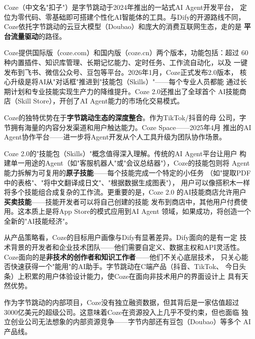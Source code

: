 Coze（中文名"扣子"）是字节跳动于2024年推出的一站式AI Agent开发平台，
定位为零代码、零基础即可搭建个性化AI智能体的工具。与Dify的开源路线不同，
Coze依托字节跳动的云豆大模型（Doubao）和庞大的消费互联网生态，走的是
\textbf{平台流量驱动}的路径。

Coze提供国际版（coze.com）和国内版（coze.cn）两个版本，功能包括：超过
60种内置插件、知识库管理、长期记忆能力、定时任务、工作流自动化，以及
一键发布到飞书、微信公众号、豆包等平台。2026年1月，Coze正式发布2.0版本，
核心升级是将AI从"对话框"推进到"技能包（Skills）"——每个专业人员都能
通过长期计划和专业技能实现生产力的降维提升。Coze 2.0还推出了全球首个
AI技能商店（Skill Store），开创了AI Agent能力的市场化交易模式。

Coze的独特优势在于\textbf{字节跳动生态的深度整合}。作为TikTok/抖音的母
公司，字节拥有海量的内容分发渠道和用户触达能力。Coze Space——2025年4月
推出的AI Agent协作平台——进一步将Agent开发从个人工具升级为团队协作场景。

Coze 2.0的"技能包（Skills）"概念值得深入理解。传统的AI Agent平台让用户
构建单一用途的Agent（如"客服机器人"或"会议总结器"），Coze的技能包则将
Agent能力拆解为可复用的\textbf{原子技能}——每个技能完成一个特定的小任务
（如"提取PDF中的表格"、"将中文翻译成日文"、"根据数据生成图表"），
用户可以像搭积木一样将多个技能组合成复杂的工作流。更重要的是，Coze 2.0
的AI技能商店允许用户\textbf{买卖技能}——技能开发者可以将自己创建的技能
发布到商店中，其他用户付费使用。这本质上是将App Store的模式应用到AI Agent
领域，如果成功，将创造一个全新的"AI技能经济"。

从产品策略看，Coze的目标用户画像与Dify有显著差异。Dify面向的是有一定
技术背景的开发者和企业技术团队——他们需要自定义、数据主权和API灵活性。
Coze面向的是\textbf{非技术的创作者和知识工作者}——他们不关心底层技术，
只关心能否快速获得一个"能用"的AI助手。字节跳动在C端产品（抖音、TikTok、
今日头条）上积累的用户体验设计能力，使Coze在面向非技术用户的界面设计上
具有天然优势。

作为字节跳动的内部项目，Coze没有独立融资数据，但其背后是一家估值超过
3000亿美元的超级公司。这意味着Coze在资源投入上几乎不受约束，但也面临
独立创业公司无法想象的内部资源竞争——字节内部还有豆包（Doubao）等多个
AI产品线。

